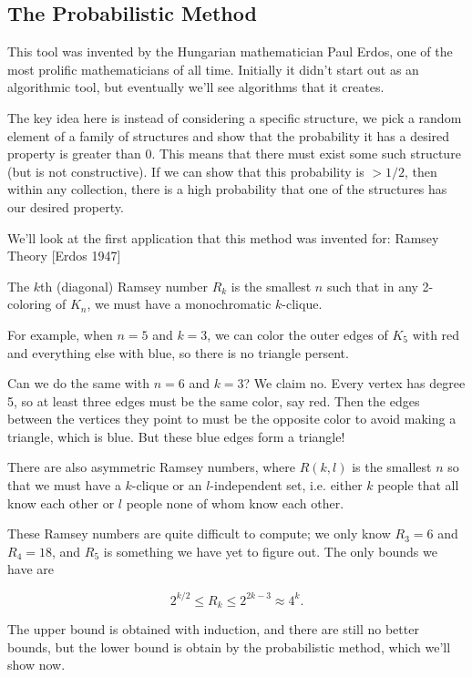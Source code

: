 \documentclass[11 pt]{scrartcl}
\begin{document}
\subsection{The Probabilistic Method}
This tool was invented by the Hungarian mathematician Paul Erdos, one of the most prolific mathematicians of all time. Initially it didn't start out as an algorithmic tool, but eventually we'll see algorithms that it creates. 

The key idea here is instead of considering a specific structure, we pick a random element of a family of structures and show that the probability it has a desired property is greater than $0$. This means that there must exist some such structure (but is not constructive). If we can show that this probability is $> 1/2$, then within any collection, there is a high probability that one of the structures has our desired property. 

We'll look at the first application that this method was invented for: Ramsey Theory [Erdos 1947]

\begin{definition}
    The $k$th (diagonal) Ramsey number $R_k$ is the smallest $n$ such that in any 2-coloring of $K_n$, we must have a monochromatic $k$-clique. 
\end{definition}

For example, when $n = 5$ and $k = 3$, we can color the outer edges of $K_5$ with red and everything else with blue, so there is no triangle persent. 

Can we do the same with $n = 6$ and $k = 3$? We claim no. Every vertex has degree 5, so at least three edges must be the same color, say red. Then the edges between the vertices they point to must be the opposite color to avoid making a triangle, which is blue. But these blue edges form a triangle! 

There are also asymmetric Ramsey numbers, where $R(k,l)$ is the smallest $n$ so that we must have a $k$-clique or an $l$-independent set, i.e. either $k$ people that all know each other or $l$ people none of whom know each other. 


These Ramsey numbers are quite difficult to compute; we only know $R_3 = 6$ and $R_4 = 18$, and $R_5$ is something we have yet to figure out. The only bounds we have are 

\[ 2^{k/2} \leq R_k \leq 2^{2k-3} \approx 4^k.\] 

The upper bound is obtained with induction, and there are still no better bounds, but the lower bound is obtain by the probabilistic method, which we'll show now. 
\end{document}
